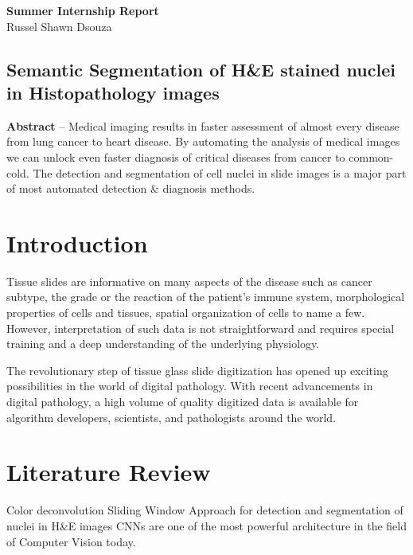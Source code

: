 \documentclass[11pt]{article}
\theoremstyle{definition}
\begin{document}
  \thispagestyle{empty}
  \begin{center}
    {\LARGE \bf Summer Internship Report}\\
    {\large Russel Shawn Dsouza}\\
  \end{center}
  
  \tableofcontents
  
  \newpage
  \begin{center}
    \section*{Semantic Segmentation of H\&E stained nuclei in Histopathology images}
      \textbf{Abstract} --
      Medical imaging results in faster assessment of almost every disease from lung cancer to heart disease. By automating the analysis of medical images we can unlock even faster diagnosis of critical diseases from cancer to common-cold. The detection and segmentation of cell nuclei in slide images is a major part of most automated detection \& diagnosis methods.
  \end{center}

  \section{Introduction}
    Tissue slides are informative on many aspects of the disease such as cancer subtype, the grade or the reaction of the patient's immune system, morphological properties of cells and tissues, spatial organization of cells to name a few.
    However, interpretation of such data is not straightforward and requires special training and a deep understanding of the underlying physiology.

    The revolutionary step of tissue glass slide digitization has opened up exciting possibilities in the world of digital pathology. 
    With recent advancements in digital pathology, a high volume of quality digitized data is available for algorithm developers, scientists, and pathologists around the world.\cite{DLInDigitalPathology}

  \section{Literature Review}
    Color deconvolution\cite{Ruifrok2001QuantificationOH}
    Sliding Window Approach for detection and segmentation of nuclei in H\&E images 
    CNNs are one of the most powerful architecture in the field of Computer Vision today. 
\end{document}
